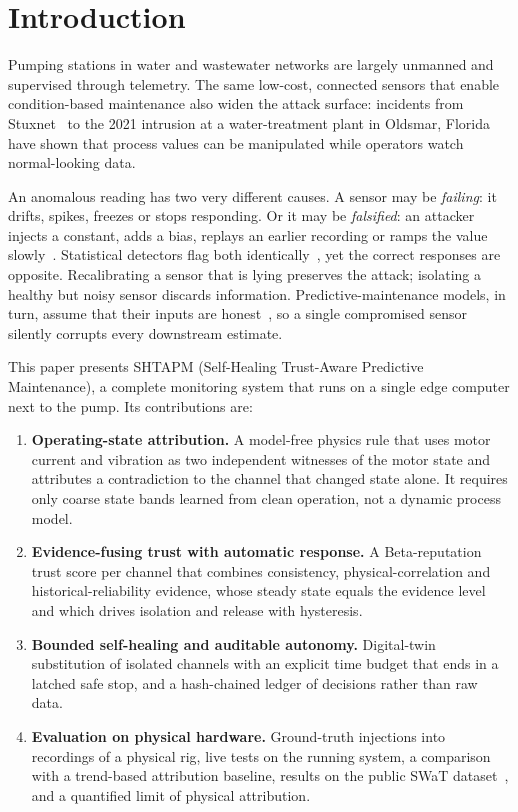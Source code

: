 \documentclass[conference]{IEEEtran}
\begin{document}
\section{Introduction}

Pumping stations in water and wastewater networks are largely unmanned and supervised through telemetry. The same low-cost, connected sensors that enable condition-based maintenance also widen the attack surface: incidents from Stuxnet~\cite{langner2011stuxnet} to the 2021 intrusion at a water-treatment plant in Oldsmar, Florida have shown that process values can be manipulated while operators watch normal-looking data.

An anomalous reading has two very different causes. A sensor may be \emph{failing}: it drifts, spikes, freezes or stops responding. Or it may be \emph{falsified}: an attacker injects a constant, adds a bias, replays an earlier recording or ramps the value slowly~\cite{liu2009fdi,mo2009replay}. Statistical detectors flag both identically~\cite{liu2008iforest,goh2017rnn}, yet the correct responses are opposite. Recalibrating a sensor that is lying preserves the attack; isolating a healthy but noisy sensor discards information. Predictive-maintenance models, in turn, assume that their inputs are honest~\cite{lee2014phm,susto2015pdm}, so a single compromised sensor silently corrupts every downstream estimate.

This paper presents SHTAPM (Self-Healing Trust-Aware Predictive Maintenance), a complete monitoring system that runs on a single edge computer next to the pump. Its contributions are:

\begin{enumerate}
  \item \textbf{Operating-state attribution.} A model-free physics rule that uses motor current and vibration as two independent witnesses of the motor state and attributes a contradiction to the channel that changed state alone. It requires only coarse state bands learned from clean operation, not a dynamic process model.
  \item \textbf{Evidence-fusing trust with automatic response.} A Beta-reputation trust score per channel that combines consistency, physical-correlation and historical-reliability evidence, whose steady state equals the evidence level and which drives isolation and release with hysteresis.
  \item \textbf{Bounded self-healing and auditable autonomy.} Digital-twin substitution of isolated channels with an explicit time budget that ends in a latched safe stop, and a hash-chained ledger of decisions rather than raw data.
  \item \textbf{Evaluation on physical hardware.} Ground-truth injections into recordings of a physical rig, live tests on the running system, a comparison with a trend-based attribution baseline, results on the public SWaT dataset~\cite{goh2016swat}, and a quantified limit of physical attribution.
\end{enumerate}
\end{document}
